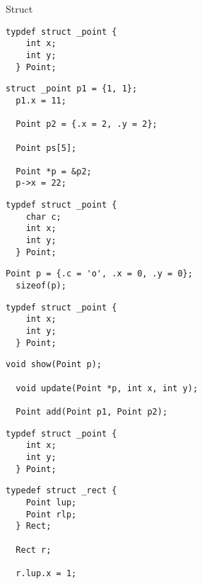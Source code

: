 \begin{frame}{}
  \centerline{\LARGE Struct}

  \vspace{0.6cm}
  \centerline{\large {}}
\end{frame}

\begin{frame}[fragile]{}
  \begin{lstlisting}[style = Cstyle]
  typdef struct _point {
    int x;
    int y;
  } Point;
  \end{lstlisting}

  \pause
  \begin{lstlisting}[style = Cstyle]
  struct _point p1 = {1, 1};
  p1.x = 11;

  Point p2 = {.x = 2, .y = 2};

  Point ps[5];

  Point *p = &p2;
  p->x = 22;
  \end{lstlisting}
\end{frame}

\begin{frame}[fragile]{}
  \begin{lstlisting}[style = Cstyle]
  typdef struct _point {
    char c;
    int x;
    int y;
  } Point;
  \end{lstlisting}

  \begin{lstlisting}[style = Cstyle]
  Point p = {.c = 'o', .x = 0, .y = 0};
  sizeof(p);
  \end{lstlisting}
\end{frame}

\begin{frame}[fragile]{}
  \begin{lstlisting}[style = Cstyle]
  typdef struct _point {
    int x;
    int y;
  } Point;
  \end{lstlisting}

  \begin{lstlisting}[style = Cstyle]
  void show(Point p);

  void update(Point *p, int x, int y);
  
  Point add(Point p1, Point p2);
  \end{lstlisting}
\end{frame}

\begin{frame}[fragile]{}
  \begin{lstlisting}[style = Cstyle]
  typdef struct _point {
    int x;
    int y;
  } Point;
  \end{lstlisting}

  \begin{lstlisting}[style = Cstyle]
  typedef struct _rect {
    Point lup;
    Point rlp;
  } Rect;

  Rect r;

  r.lup.x = 1;
  \end{lstlisting}
\end{frame}
